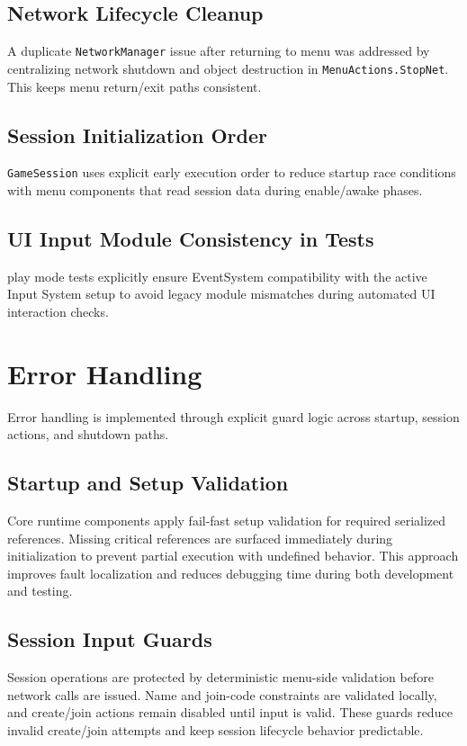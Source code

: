 \subsection*{Network Lifecycle Cleanup}
A duplicate \texttt{NetworkManager} issue after returning to menu was addressed by centralizing network shutdown and object destruction in \texttt{MenuActions.StopNet}. This keeps menu return/exit paths consistent.

\subsection*{Session Initialization Order}
\texttt{GameSession} uses explicit early execution order to reduce startup race conditions with menu components that read session data during enable/awake phases.

\subsection*{UI Input Module Consistency in Tests}
play mode tests explicitly ensure EventSystem compatibility with the active Input System setup to avoid legacy module mismatches during automated UI interaction checks.

\section{Error Handling}
Error handling is implemented through explicit guard logic across startup, session actions, and shutdown paths.

\subsection*{Startup and Setup Validation}
Core runtime components apply fail-fast setup validation for required serialized references. Missing critical references are surfaced immediately during initialization to prevent partial execution with undefined behavior. This approach improves fault localization and reduces debugging time during both development and testing.

\subsection*{Session Input Guards}
Session operations are protected by deterministic menu-side validation before network calls are issued. Name and join-code constraints are validated locally, and create/join actions remain disabled until input is valid. These guards reduce invalid create/join attempts and keep session lifecycle behavior predictable.

